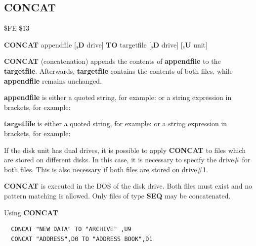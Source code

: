 
\newpage
\subsection{CONCAT}
\begin{description}[leftmargin=2cm,style=nextline]
\item [Token:] \$FE \$13
\item [Format:] {\bf CONCAT} appendfile [{\bf,D} drive] {\bf TO}
                targetfile [{\bf,D} drive] [{\bf,U} unit]
\item [Usage:]
   {\bf CONCAT} (concatenation) appends the contents of
   {\bf appendfile} to the {\bf targetfile}. Afterwards, {\bf targetfile}
   contains the contents of both files, while {\bf appendfile}
   remains unchanged.

   {\bf appendfile} is either a quoted string, for example:  or
   a string expression in brackets, for example: 

   {\bf targetfile} is either a quoted string, for example:  or
   a string expression in brackets, for example: 

   If the disk unit has dual drives, it is possible to apply
   {\bf CONCAT} to files which are stored on different
   disks. In this case, it is necessary to specify the drive\#
   for both files. This is also necessary if both
   files are stored on drive\#1.

   \drivedefinition

   \unitdefinition

\item [Remarks:]
   {\bf CONCAT} is executed in the DOS of the disk drive.
   Both files must exist and no pattern matching is allowed.
   Only files of type {\bf SEQ} may be concatenated.

\item [Examples:] Using {\bf CONCAT}
\begin{tcolorbox}[colback=black,coltext=white]
\verbatimfont{\codefont}
\begin{verbatim}
  CONCAT "NEW DATA" TO "ARCHIVE" ,U9
  CONCAT "ADDRESS",D0 TO "ADDRESS BOOK",D1
\end{verbatim}
\end{tcolorbox}
\end{description}


\newpage
